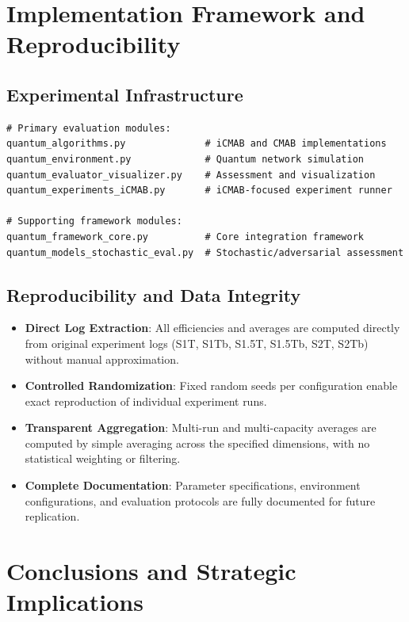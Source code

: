 \documentclass[12pt,a4paper]{article}
\begin{document}
\section{Implementation Framework and Reproducibility}

\subsection{Experimental Infrastructure}

\begin{lstlisting}[caption=Core Framework Components]
# Primary evaluation modules:
quantum_algorithms.py              # iCMAB and CMAB implementations
quantum_environment.py             # Quantum network simulation
quantum_evaluator_visualizer.py    # Assessment and visualization
quantum_experiments_iCMAB.py       # iCMAB-focused experiment runner

# Supporting framework modules:
quantum_framework_core.py          # Core integration framework
quantum_models_stochastic_eval.py  # Stochastic/adversarial assessment
\end{lstlisting}

\subsection{Reproducibility and Data Integrity}

\begin{itemize}
\item \textbf{Direct Log Extraction}: All efficiencies and averages are computed directly from original experiment logs (S1T, S1Tb, S1.5T, S1.5Tb, S2T, S2Tb) without manual approximation.
\item \textbf{Controlled Randomization}: Fixed random seeds per configuration enable exact reproduction of individual experiment runs.
\item \textbf{Transparent Aggregation}: Multi-run and multi-capacity averages are computed by simple averaging across the specified dimensions, with no statistical weighting or filtering.
\item \textbf{Complete Documentation}: Parameter specifications, environment configurations, and evaluation protocols are fully documented for future replication.
\end{itemize}

\newpage
\section{Conclusions and Strategic Implications}
\end{document}

